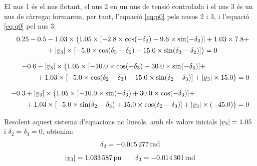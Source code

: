 \begin{exemple}
    El nus 1 és el nus flotant, el nus 2 en un nus de tensió controlada
    i el nus 3 és un nus de càrrega; formarem, per tant, l'equació
    \eqref{eq:p0} pels nusos 2 i 3, i l'equació \eqref{eq:q0} pel nus 3:
    \begin{align*}
    \begin{split}
    \num{0,25}-\num{0,5} &- \num{1,03}\times \bigl( \num{1,05}\times [\num{-2,8}
    \times\cos(-\delta_2) - \num{9,6}
    \times\sin( -\delta_2)]  + \num{1,03} \times \num{7,8} {}+ \\
    &+ |\cmplx{v}_3|\times [\num{-5,0} \times\cos(\delta_3-\delta_2) -
    \num{15,0}\times \sin(\delta_3-\delta_2)]
     \bigr)  = 0 \end{split} \\[1.5ex]
    \begin{split}
    \num{-0,6} &- |\cmplx{v}_3| \times \bigl( \num{1,05}\times [-\num{10,0}
    \times\cos(-\delta_3)
    - \num{30,0}\times\sin(-\delta_3)]  + \\
    &+ \num{1,03}\times [-\num{5,0}\times\cos(\delta_2-\delta_3) -
    \num{15,0}\times\sin(\delta_2-\delta_3)]
     + |\cmplx{v}_3| \times \num{15,0} \bigr)  = 0 \end{split}  \\[1.5ex]
    \begin{split}
    -\num{0,3} &+ |\cmplx{v}_3|\times \bigl( \num{1,05}
    \times[-\num{10,0}\times\sin(-\delta_3) +
    \num{30,0}\times\cos(-\delta_3)]  + \\
    &+ \num{1,03} \times[-\num{5,0}\times\sin(\delta_2-\delta_3) +
    \num{15,0}\times\cos(\delta_2-\delta_3)] + |\cmplx{v}_3|\times (\num{-45,0})
    \bigr)  = 0 \end{split}
    \end{align*}

    Resolent aquest sistema d'equacions no lineals, amb els valors
    inicials $|\cmplx{v}_3|=\num{1,05}$ i $\delta_2=\delta_3=0$, obtenim:
    \begin{gather*}
       \delta_2=\SI{-0,015277}{rad} \\[1ex]
       |\cmplx{v}_3|=\SI{1,033587}{pu} \qquad \delta_3=\SI{-0,014301}{rad}
    \end{gather*}


\end{exemple}
